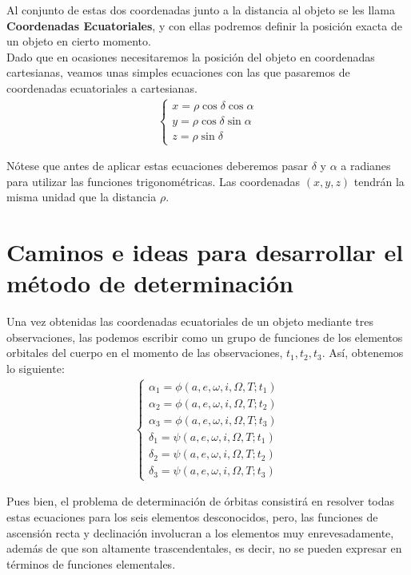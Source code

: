 \documentclass[11pt]{book}
\begin{document}
Al conjunto de estas dos coordenadas junto a la distancia al objeto se les llama \textbf{Coordenadas Ecuatoriales}, y con ellas podremos definir la posición exacta de un objeto en cierto momento.\\

Dado que en ocasiones necesitaremos la posición del objeto en coordenadas cartesianas, veamos unas simples ecuaciones con las que pasaremos de coordenadas ecuatoriales a cartesianas.
\begin{align}
\left\{
\begin{array}{l}
	x = \rho \cos{\delta}\cos{\alpha}\\
	y = \rho \cos{\delta}\sin{\alpha}\\
	z = \rho \sin{\delta}
\end{array}
\right.
\label{eq:equatorial_to_cartesian}
\end{align}

Nótese que antes de aplicar estas ecuaciones deberemos pasar $\delta$ y $\alpha$ a radianes para utilizar las funciones trigonométricas. Las coordenadas $(x,y,z)$ tendrán la misma unidad que la distancia $\rho$.\\

\section{Caminos e ideas para desarrollar el método de determinación}
\label{sec:ideas_for_develope_method}
Una vez obtenidas las coordenadas ecuatoriales de un objeto mediante tres observaciones, las podemos escribir como un grupo de funciones de los elementos orbitales del cuerpo en el momento de las observaciones, $t_1, t_2, t_3$. Así, obtenemos lo siguiente:
\begin{align}
\left\{\begin{array}{l}
	\alpha_1 = \phi(a, e, \omega, i, \Omega, T; t_1)\\ 
	\alpha_2 = \phi(a, e, \omega, i, \Omega, T; t_2)\\ 
	\alpha_3 = \phi(a, e, \omega, i, \Omega, T; t_3)\\ 
	\delta_1 = \psi(a, e, \omega, i, \Omega, T; t_1)\\ 
	\delta_2 = \psi(a, e, \omega, i, \Omega, T; t_2)\\
	\delta_3 = \psi(a, e, \omega, i, \Omega, T; t_3)
\end{array}
\right.
\label{eq:ascension_declinacion}
\end{align}

Pues bien, el problema de determinación de órbitas consistirá en resolver todas estas ecuaciones para los seis elementos desconocidos, pero, las funciones de ascensión recta y declinación involucran a los elementos muy enrevesadamente, además de que son altamente trascendentales, es decir, no se pueden expresar en términos de funciones elementales.\\
\end{document}
